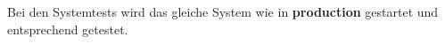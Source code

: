 

Bei den Systemtests wird das gleiche System wie in \textbf{production} 
gestartet und entsprechend getestet.

